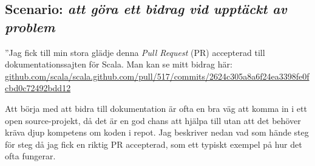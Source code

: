 \subsection*{Scenario: \emph{att göra ett bidrag vid upptäckt av problem}}

''Jag fick till min stora glädje denna \emph{Pull Request} (PR) accepterad till dokumentationssajten för Scala. Man kan se mitt bidrag här:\\
\href{https://github.com/scala/scala.github.com/pull/517/commits/2624c305a8a6f24ea3398fe0fcbd0c72492bdd12}{\small github.com/scala/scala.github.com/pull/517/commits/2624c305a8a6f24ea3398fe0fcbd0c72492bdd12} 

Att börja med att bidra till dokumentation är ofta en bra väg att komma in i ett open source-projekt, då det är en god chans att hjälpa till utan att det behöver kräva djup kompetens om koden i repot. Jag beskriver nedan vad som hände steg för steg då jag fick en riktig PR accepterad, som ett typiskt exempel på hur det ofta fungerar.

